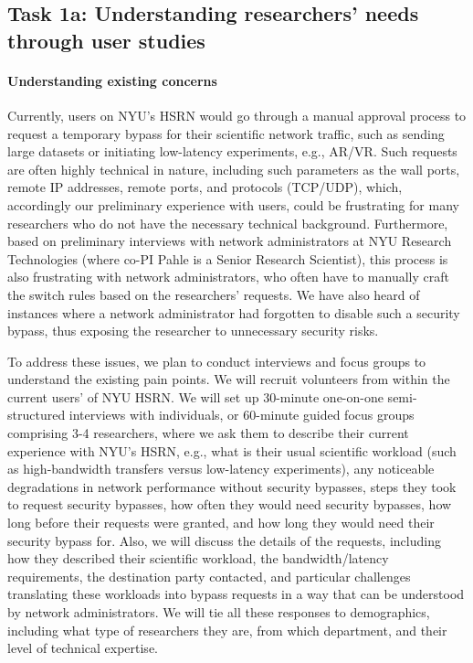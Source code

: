 \subsection{Task 1a: Understanding researchers' needs through user studies}

\paragraph{Understanding existing concerns}
Currently, users on NYU's HSRN would go through a manual approval process to request a temporary bypass for their scientific network traffic, such as sending large datasets or initiating low-latency experiments, e.g., AR/VR. Such requests are often highly technical in nature, including such parameters as the wall ports, remote IP addresses, remote ports, and protocols (TCP/UDP), which, accordingly our preliminary experience with users, could be frustrating for many researchers who do not have the necessary technical background. Furthermore, based on preliminary interviews with network administrators at NYU Research Technologies (where co-PI Pahle is a Senior Research Scientist), this process is also frustrating with network administrators, who often have to manually craft the switch rules based on the researchers' requests. We have also heard of instances where a network administrator had forgotten to disable such a security bypass, thus exposing the researcher to unnecessary security risks.

To address these issues, we plan to conduct interviews and focus groups to understand the existing pain points. We will recruit volunteers from within the current users' of NYU HSRN. We will set up 30-minute one-on-one semi-structured interviews with individuals, or 60-minute guided focus groups comprising 3-4 researchers, where we ask them to describe their current experience with NYU's HSRN, e.g., what is their usual scientific workload (such as high-bandwidth transfers versus low-latency experiments), any noticeable degradations in network performance without security bypasses, steps they took to request security bypasses, how often they would need security bypasses, how long before their requests were granted, and how long they would need their security bypass for. Also, we will discuss the details of the requests, including how they described their scientific workload, the bandwidth/latency requirements, the destination party contacted, and particular challenges translating these workloads into bypass requests in a way that can be understood by network administrators. We will tie all these responses to demographics, including what type of researchers they are, from which department, and their level of technical expertise.

